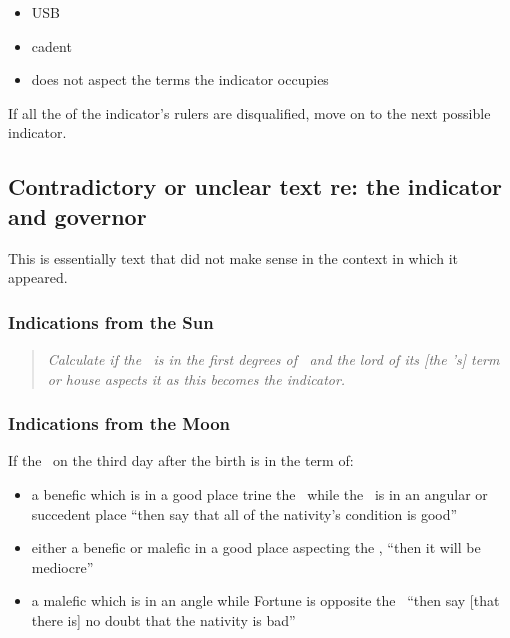 \begin{itemize}[topsep=0em, itemsep=0em]
\item {} USB
\item {} cadent
\item {} does not aspect the terms the indicator occupies
\end{itemize}

If all the of the indicator's rulers are disqualified, move on to the next possible indicator.
\newpage
\subsection{Contradictory or unclear text re: the indicator and governor}
\begin{mdframed}[backgroundcolor=cyan!5, rightmargin=1em, leftmargin=1em]
This is essentially text that did not make sense in the context in which it appeared.
\end{mdframed}

\subsubsection{Indications from the Sun}
\begin{quote}
\textsl{Calculate if the \Sun\, is in the first degrees of \Aries\, and the lord of its [the \Sun's] term or house aspects it as this becomes the indicator.}
\end{quote}

\subsubsection{Indications from the Moon}
If  the \Moon\, on the third day after the birth is in the term of:

\begin{itemize}[topsep=0em,itemsep=0em]
\item a benefic which is in a good place trine the \Moon\, while the \Moon\, is in an angular or succedent place ``then say that all of the nativity's condition is good''

\item either  a benefic or malefic in a good place aspecting the \Moon, ``then it will be mediocre''

\item a  malefic which is in an angle while Fortune is opposite the \Moon\, ``then say [that there is] no doubt that the nativity is bad''
\end{itemize}

